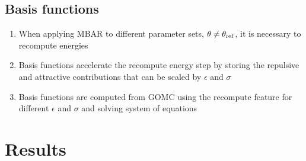 \documentclass[journal=jced,manuscript=article]{achemso}
\begin{document}
\subsection{Basis functions} \label{sec: Basis functions}

\begin{enumerate}
	\item When applying MBAR to different parameter sets, $\theta \neq \theta_{\rm ref}$, it is necessary to recompute energies
	\item Basis functions accelerate the recompute energy step by storing the repulsive and attractive contributions that can be scaled by $\epsilon$ and $\sigma$
	\item Basis functions are computed from GOMC using the recompute feature for different $\epsilon$ and $\sigma$ and solving system of equations
\end{enumerate}

\section{Results} \label{sec: Results}
\end{document}
